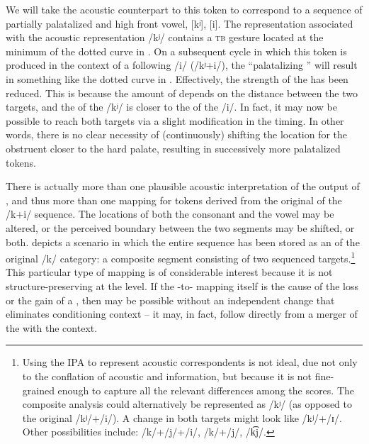 We will take the acoustic counterpart to this  token to\largerpage
correspond to a sequence of partially palatalized  and high front vowel, 
{[kʲ]}, {[i]}. The  representation associated with the acoustic
representation {/kʲ/} contains a \textsc{tb} gesture located at the
minimum of the dotted curve in . On a subsequent
 cycle in which this token is produced in the context of
a following {/i/} ({/kʲ+i/}), the “palatalizing
” will result in something like the dotted curve in .
Effectively, the strength of the  has been reduced. This is because
the amount of  depends on the distance between the two targets,
and the  of the {/kʲ/} is closer to the  of
the {/i/}. In fact, it may now be possible to reach both
targets via a slight modification in the  timing. In other
words, there is no clear necessity of (continuously) shifting the
 location for the obstruent closer to the hard palate, resulting
in successively more palatalized tokens. 

There is actually more than one plausible acoustic interpretation
of the output of , and thus more than one 
mapping for tokens derived from the original  of the {/k+i/}
sequence. The  locations of both the consonant and the vowel
may be altered, or the perceived boundary between the two segments
may be shifted, or both.  depicts a
scenario in which the entire sequence has been stored as an 
of the original {/k/} category: a composite segment consisting
of two sequenced targets.\footnote{Using the IPA to represent acoustic correspondents is not ideal, due
not only to the conflation of acoustic and  information,
but because it is not fine-grained enough to capture all the relevant
differences among the  scores. The composite analysis could
alternatively be represented as {/kʲ/} (as opposed to the
original {/kʲ/+/i/}). A change in both targets might look
like {/kʲ/+/ɪ/}. Other possibilities include: {/k/+/j/+/i/},
{/k/+/j/}, {/k͡j/}.} This particular type of mapping is of considerable interest because
it is not structure-preserving at the  level. If the -to- mapping itself is the cause of the loss or the
gain of a , then  may be possible without an independent
change that eliminates conditioning context – it may, in fact, follow
directly from a merger of the  with the  context. 

